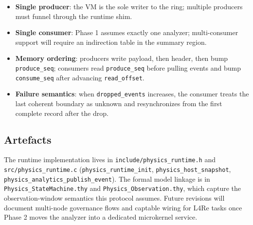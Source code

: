 \begin{itemize}
  \item \textbf{Single producer}: the VM is the sole writer to the ring;
    multiple producers must funnel through the runtime shim.
  \item \textbf{Single consumer}: Phase 1 assumes exactly one analyzer;
    multi-consumer support will require an indirection table in the summary
    region.
  \item \textbf{Memory ordering}: producers write payload, then header, then
    bump \texttt{produce\_seq}; consumers read \texttt{produce\_seq} before
    pulling events and bump \texttt{consume\_seq} after advancing
    \texttt{read\_offset}.
  \item \textbf{Failure semantics}: when \texttt{dropped\_events} increases, the
    consumer treats the last coherent boundary as unknown and resynchronizes
    from the first complete record after the drop.
\end{itemize}

\subsection{Artefacts}

The runtime implementation lives in \texttt{include/physics\_runtime.h} and
\texttt{src/physics\_runtime.c} (\texttt{physics\_runtime\_init},
\texttt{physics\_host\_snapshot},
\texttt{physics\_analytics\_publish\_event}). The formal model linkage is in
\texttt{Physics\_StateMachine.thy} and \texttt{Physics\_Observation.thy}, which
capture the observation-window semantics this protocol assumes. Future revisions
will document multi-node governance flows and captable wiring for L4Re tasks
once Phase 2 moves the analyzer into a dedicated microkernel service.
